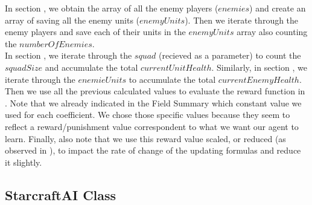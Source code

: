 In section , we obtain the array of all the enemy players ($enemies$) and create an array of saving all the enemy units ($enemyUnits$). Then we iterate through the enemy players and save each of their units in the $enemyUnits$ array also counting the $numberOfEnemies$. \\

In section , we iterate through the $squad$ (recieved as a parameter) to count the $squadSize$ and accumulate the total $currentUnitHealth$. Similarly, in section , we iterate through the $enemieUnits$ to accumulate the total $currentEnemyHealth$.\\

Then we use all the previous calculated values to evaluate the reward function in . Note that we already indicated in the Field Summary which constant value we used for each coefficient. We chose those specific values because they seem to reflect a reward/punishment value correspondent to what we want our agent to learn. Finally, also note that we use this reward value scaled, or reduced (as observed in ), to impact the rate of change of the updating formulas and reduce it slightly. \\


\subsection{StarcraftAI Class}